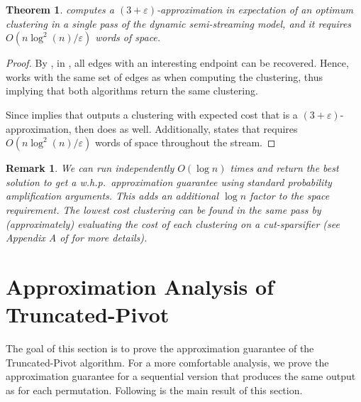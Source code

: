 \documentclass[10pt,a4paper]{article}
\makeatletter
\newtheorem{theorem}{Theorem}[section]
\newtheorem{remark}{Remark}[section]
\newcommand{\seqtruncatedpivot}{Sequential \textrm{Truncated-Pivot}\xspace}
\newcommand{\truncatedpivot}{\textrm{Truncated-Pivot}\xspace}
\newcommand{\eps}{\ensuremath{\varepsilon}}
\newcommand\IfRestateTF{%
  \ifx\label\thmt@gobble@label %
    \expandafter\@firstoftwo
  \else
    \expandafter\@secondoftwo
  \fi
}
\newcommand{\RestateRemark}{\IfRestateTF{{\normalfont\bfseries (Restated) }}{}}
\makeatother
\begin{document}
{\begin{theorem}
     computes a $(3+\eps)$-approximation in expectation of an optimum clustering in a single pass of the dynamic semi-streaming model, and it requires $O(n\log^2(n)/\eps)$ words of space.
\end{theorem} 
\begin{proof}
    By , in , all edges with an interesting endpoint can be recovered. Hence,  works with the same set of edges as  when computing the clustering, thus implying that both algorithms return the same clustering. 
    
    Since  implies that  outputs a clustering with expected cost that is a $(3+\eps)$-approximation, then  does as well. 
    Additionally,  states that  requires $O(n\log^2(n)/\eps)$ words of space throughout the stream. 
\end{proof}

\begin{remark}
    We can run  independently $O(\log n)$ times and return the best solution to get a w.h.p.\ approximation guarantee using standard probability amplification arguments. This adds an additional $\log n$ factor to the space requirement. The lowest cost clustering can be found in the same pass by (approximately) evaluating the cost of each clustering on a cut-sparsifier \cite{ahn2009CutSparsifiers} (see Appendix A of \cite{behnezhad2023single} for more details).
\end{remark}

}

\section{Approximation Analysis of \truncatedpivot}\label{sec: approximation-analysis}

The goal of this section is to prove the approximation guarantee of the \truncatedpivot algorithm.
For a more comfortable analysis, we prove the approximation guarantee for a sequential version that produces the same output as  for each permutation. Following is the main result of this section.

\end{document}
